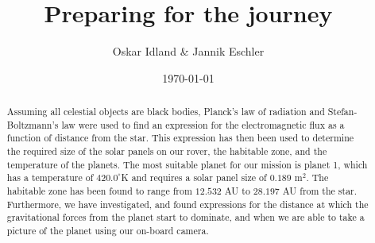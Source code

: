 \documentclass[reprint,english,notitlepage]{revtex4-2}
\begin{document}
\title{Preparing for the journey}
\author{Oskar Idland \& Jannik Eschler}
\date{\today}

\begin{abstract}
	Assuming all celestial objects are black bodies, Planck's law of radiation and Stefan-Boltzmann's law were used to find an expression for the electromagnetic flux as a function of distance from the star.
	This expression has then been used to determine the required size of the solar panels on our rover, the habitable zone, and the temperature of the planets.
	The most suitable planet for our mission is planet 1, which has a temperature of $420.0^{\circ}$K and requires a solar panel size of $0.189$ m$^2$.
	The habitable zone has been found to range from $12.532$ AU to $28.197$ AU from the star.
	Furthermore, we have investigated, and found expressions for the distance at which the gravitational forces from the planet start to dominate, and when we are able to take a picture of the planet using our on-board camera.
\end{abstract}
\maketitle
\end{document}
